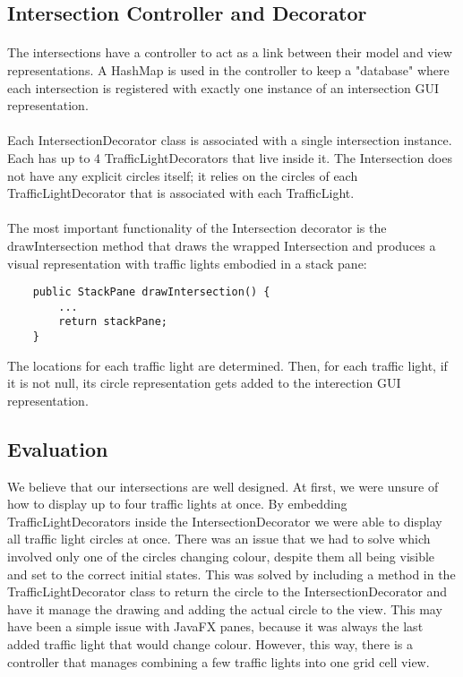 \documentclass[a4paper,11pt,titlepage]{article}
\begin{document}
\subsection{Intersection Controller and Decorator}
\paragraph{}
The intersections have a controller to act as a link between their model and view representations. A HashMap is used in the controller to keep a "database" where each intersection is registered with exactly one instance of an intersection GUI representation.
\paragraph{}
Each IntersectionDecorator class is associated with a single intersection instance. Each has up to 4 TrafficLightDecorators that live inside it. The Intersection does not have any explicit circles itself; it relies on the circles of each TrafficLightDecorator that is associated with each TrafficLight.
\paragraph{}
The most important functionality of the Intersection decorator is the drawIntersection method that draws the wrapped Intersection and produces a visual representation with traffic lights embodied in a stack pane:
\begin{lstlisting}
	public StackPane drawIntersection() {
		...
		return stackPane;	
	}
\end{lstlisting}
The locations for each traffic light are determined. Then, for each traffic light, if it is not null, its circle representation gets added to the interection GUI representation.
\subsection{Evaluation}
We believe that our intersections are well designed. At first, we were unsure of how to display up to four traffic lights at once. By embedding TrafficLightDecorators inside the IntersectionDecorator we were able to display all traffic light circles at once. There was an issue that we had to solve which involved only one of the circles changing colour, despite them all being visible and set to the correct initial states. This was solved by including a method in the TrafficLightDecorator class to return the circle to the IntersectionDecorator and have it manage the drawing and adding the actual circle to the view. This may have been a simple issue with JavaFX panes, because it was always the last added traffic light that would change colour. However, this way, there is a controller that manages combining a few traffic lights into one grid cell view. 
\end{document}
